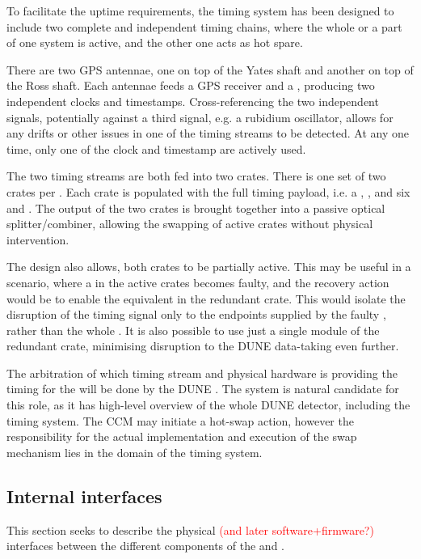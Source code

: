 \documentclass{article}
\begin{document}
To facilitate the uptime requirements, the timing system has been designed to include two complete and independent timing chains, where the whole or a part of one system is active, and the other one acts as hot spare.

There are two GPS antennae, one on top of the Yates shaft and another on top of the Ross shaft. Each antennae feeds a GPS receiver and a , producing two independent  clocks and timestamps. Cross-referencing the two independent signals, potentially against a third signal, e.g. a rubidium oscillator, allows for any drifts or other issues in one of the  timing streams to be detected. At any one time, only one of the  clock and timestamp are actively used.

The two  timing streams are both fed into two  crates. There is one set of two  crates per . Each crate is populated with the full timing  payload, i.e. a , , and six  and . The output of the two crates is brought together into a passive optical splitter/combiner, allowing the swapping of active crates without physical intervention.

The design also allows, both crates to be partially active. This may be useful in a scenario, where a  in the active crates becomes faulty, and the recovery action would be to enable the equivalent  in the redundant crate. This would isolate the disruption of the timing signal only to the endpoints supplied by the faulty , rather than the whole . It is also possible to use just a single  module of the redundant crate, minimising disruption to the DUNE data-taking even further.

The arbitration of which  timing stream and physical hardware is providing the timing for the  will be done by the DUNE . The  system is natural candidate for this role, as it has high-level overview of the whole DUNE detector, including the timing system. The CCM may initiate a hot-swap action, however the responsibility for the actual implementation and execution of the swap mechanism lies in the domain of the timing system.

\subsection{Internal interfaces}
This section seeks to describe the physical \textcolor{red}{(and later software+firmware?)} interfaces between the different components of the  and . 
\end{document}
